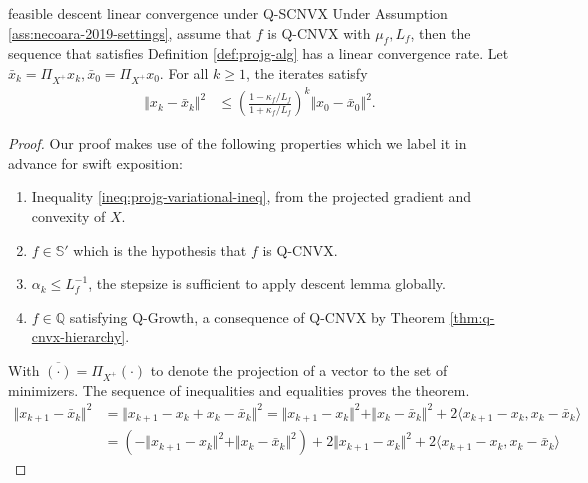 \documentclass[12pt]{report}
\begin{document}
            \begin{theorem}{feasible descent linear convergence under Q-SCNVX}
                Under Assumption \ref{ass:necoara-2019-settings}, assume that $f$ is Q-CNVX with $\mu_f, L_f$, then the sequence that satisfies Definition \ref{def:projg-alg} has a linear convergence rate. 
                Let $\bar x_k = \Pi_{X^+}x_k, \bar x_0 = \Pi_{X^+} x_0$. 
                For all $k \ge 1$, the iterates satisfy
                \begin{align*}
                    \Vert x_k - \bar x_k\Vert^2 &\le \left(
                        \frac{1 - \kappa_f/L_f}{1 + \kappa_f/L_f}
                    \right)^k \Vert x_0 - \bar x_0\Vert^2. 
                \end{align*}
            \end{theorem}
            \begin{proof}
                Our proof makes use of the following properties which we label it in advance for swift exposition: 
                \begin{enumerate}
                    \item Inequality \eqref{ineq:projg-variational-ineq}, from the projected gradient and convexity of $X$. 
                    \item $f \in \mathbb S'$ which is the hypothesis that $f$ is Q-CNVX. 
                    \item $\alpha_k \le L_f^{-1}$, the stepsize is sufficient to apply descent lemma globally. 
                    \item $f \in \mathbb Q$ satisfying Q-Growth, a consequence of Q-CNVX by Theorem \ref{thm:q-cnvx-hierarchy}. 
                \end{enumerate}
                With $\overline{(\cdot)} = \Pi_{X^+}(\cdot)$ to denote the projection of a vector to the set of minimizers. 
                The sequence of inequalities and equalities proves the theorem. 
                {\allowdisplaybreaks
                \begin{align*}
                    \Vert x_{k + 1} - \bar x_k\Vert^2
                    &= 
                    \Vert x_{k + 1} - x_k + x_k - \bar x_k\Vert^2 
                    = \Vert x_{k + 1} - x_k\Vert^2 + \Vert x_k - \bar x_k\Vert^2 + 2\langle x_{k + 1} - x_k, x_k - \bar x_k\rangle
                    \\
                    &= (- \Vert x_{k + 1} - x_k\Vert^2 + \Vert x_k - \bar x_k\Vert^2)
                    + 2\Vert x_{k + 1} - x_k\Vert^2 + 2\langle x_{k + 1} - x_k, x_k - \bar x_k\rangle

\end{align*}}
\end{proof}
\end{document}
